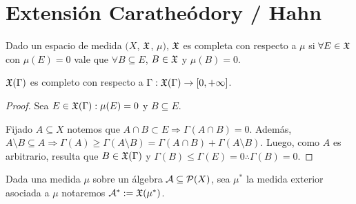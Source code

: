 \section{Extensión Caratheódory / Hahn}

\begin{definition}
    Dado un espacio de medida \((X\), \(\mathfrak{X}\), \(\mu)\), \(\mathfrak{X}\) es completa con respecto a \(\mu\) si \(\forall E \in \mathfrak{X}\) con \(\mu(E) = 0\) vale que
    \(\forall B \subseteq E\), \(B \in \mathfrak{X}\) y \(\mu(B) = 0\).
\end{definition}

\begin{corollary}
    \(\mathfrak{X}(\Gamma)\) es completo con respecto a \(\Gamma: \mathfrak{X}(\Gamma) \to [0, +\infty]\).
    \begin{proof}
        Sea \(E \in \mathfrak{X}(\Gamma) : \mu(E) = 0\) y \(B \subseteq E\).

        Fijado \(A \subseteq X\) notemos que \(A \cap B \subset E \Rightarrow \Gamma(A \cap B) = 0\).
        Además, \(A \setminus B \subseteq A \Rightarrow \Gamma(A) \geq \Gamma(A \setminus B) = \Gamma(A \cap B) + \Gamma(A \setminus B)\).
        Luego, como \(A\) es arbitrario, resulta que \(B \in \mathfrak{X}(\Gamma)\) y \(\Gamma(B) \leq \Gamma(E) = 0 \therefore \Gamma(B) = 0\).
    \end{proof}
\end{corollary}

Dada una medida \(\mu\) sobre un álgebra \(\mathcal{A} \subseteq \mathcal{P}(X)\), sea \(\mu^*\) la medida exterior asociada a \(\mu\) notaremos \(\mathcal{A}^* := \mathfrak{X}(\mu^*)\).

